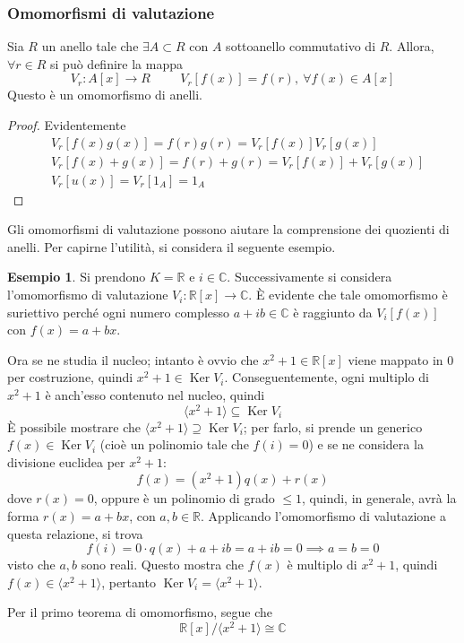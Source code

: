 \documentclass[11pt, a4paper]{scrartcl}
\theoremstyle{definition}
\newtheorem{esempio}{Esempio}
\numberwithin{esempio}{section}
\theoremstyle{definition}
\numberwithin{obs}{section}
\numberwithin{nota}{section}
\numberwithin{equation}{subsection}
\begin{document}
\subsubsection{Omomorfismi di valutazione}
Sia $R$ un anello tale che $\exists A \subset R$ con $A$ sottoanello commutativo di $R$.
Allora, $\forall r \in R$ si pu\`o definire la mappa
\[
	V_r : A[x] \to R \hspace{1cm} V_r[f(x)] = f(r), \ \forall f(x) \in A[x]
\] 
Questo \`e un omomorfismo di anelli.
\begin{proof}
	Evidentemente
	\[
	\begin{split}
		&V_r [f(x) g(x)]= f(r) g(r) = V_r[f(x)]V_r[g(x)]\\
		&V_r [f(x) + g(x)] = f(r) + g(r) = V_r[f(x)] + V_r[g(x)]\\
		&V_r[u(x)] = V_r[1_A] = 1_A
	\end{split}
	\] 
\end{proof}
Gli omomorfismi di valutazione possono aiutare la comprensione dei quozienti di anelli.
Per capirne l'utilit\`a, si considera il seguente esempio.
\begin{esempio}
Si prendono $K = \mathbb{R}$ e $i \in \mathbb{C}$.
Successivamente si considera l'omomorfismo di valutazione $V_i : \mathbb{R}[x] \to \mathbb{C}$.
\`E evidente che tale omomorfismo \`e suriettivo perch\'e ogni numero complesso $a+ib \in \mathbb{C}$ \`e raggiunto da $V_i[f(x)]$ con $f(x) = a + bx$.

Ora se ne studia il nucleo; intanto \`e ovvio che $x^2 + 1 \in \mathbb{R}[x]$ viene mappato in $0$ per costruzione, quindi $x^2 + 1 \in \operatorname{Ker} V_i $.
Conseguentemente, ogni multiplo di $x^2 + 1$ \`e anch'esso contenuto nel nucleo, quindi 
\[
\langle x^2 +1  \rangle \subseteq \operatorname{Ker} V_i
\] 
\`E possibile mostrare che $\langle x^2 + 1 \rangle\supseteq \operatorname{Ker} V_i$; per farlo, si prende un generico $f(x) \in \operatorname{Ker} V_i$ (cio\`e un polinomio tale che $f(i) = 0$) e se ne considera la divisione euclidea per $x^2 +1 $:
\[
f(x) = (x^2 +1) q(x) + r(x)
\] 
dove $r(x)=0$, oppure \`e un polinomio di grado $\le 1$, quindi, in generale, avr\`a la forma $r(x) = a +bx$, con $a,b \in \mathbb{R}$. 
Applicando l'omomorfismo di valutazione a questa relazione, si trova
\[
f(i) = 0\cdot q(x) + a + ib = a+ib = 0 \implies a = b = 0
\] 
visto che $a,b$ sono reali.
Questo mostra che $f(x) $ \`e multiplo di $x^2 + 1$, quindi $f(x) \in \langle x^2 + 1 \rangle$, pertanto $\operatorname{Ker} V_i = \langle x^2 + 1 \rangle$.

Per il primo teorema di omomorfismo, segue che 
\[
	\mathbb{R}[x] / \langle x^2 + 1 \rangle \cong \mathbb{C}
\] 
\end{esempio}
\end{document}
